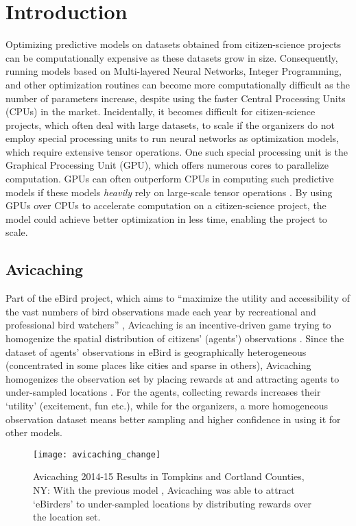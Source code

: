 \chapter{Introduction} \label{sec:Introduction}
Optimizing predictive models on datasets obtained from citizen-science projects can be computationally expensive as these datasets grow in size. Consequently, running models based on Multi-layered Neural Networks, Integer Programming, and other optimization routines can become more computationally difficult as the number of parameters increase, despite using the faster Central Processing Units (CPUs) in the market. Incidentally, it becomes difficult for citizen-science projects, which often deal with large datasets, to scale if the organizers do not employ special processing units to run neural networks as optimization models, which require extensive tensor operations. One such special processing unit is the Graphical Processing Unit (GPU), which offers numerous cores to parallelize computation. GPUs can often outperform CPUs in computing such predictive models if these models \textit{heavily} rely on large-scale tensor operations \cite{ParallelNVIDIA, cuDNNPaper}. By using GPUs over CPUs to accelerate computation on a citizen-science project, the model could achieve better optimization in less time, enabling the project to scale.

\section{Avicaching} \label{sec:Avicaching}
Part of the eBird project, which aims to ``maximize the utility and accessibility of the vast numbers of bird observations made each year by recreational and professional bird watchers'' \cite{EBird}, Avicaching is an incentive-driven game trying to homogenize the spatial distribution of citizens' (agents') observations \cite{Xue2016Avi1, Xue2016Avi2}. Since the dataset of agents' observations in eBird is geographically heterogeneous (concentrated in some places like cities and sparse in others), Avicaching homogenizes the observation set by placing rewards at and attracting agents to under-sampled locations \cite{Xue2016Avi1}. For the agents, collecting rewards increases their `utility' (excitement, fun etc.), while for the organizers, a more homogeneous observation dataset means better sampling and higher confidence in using it for other models. 
\begin{figure}[!htbp]
    \centering
    \texttt{[image: avicaching\_change]}
    \caption[Avicaching 2014-15 Results in Tompkins and Cortland Counties]{Avicaching 2014-15 Results in Tompkins and Cortland Counties, NY: With the previous model \cite{Xue2016Avi1, Xue2016Avi2, EBird}, Avicaching was able to attract `eBirders' to under-sampled locations by distributing rewards over the location set.}
    \label{fig:Avicaching 2014-15 Results in Tompkins and Cortland Counties}
\end{figure}

